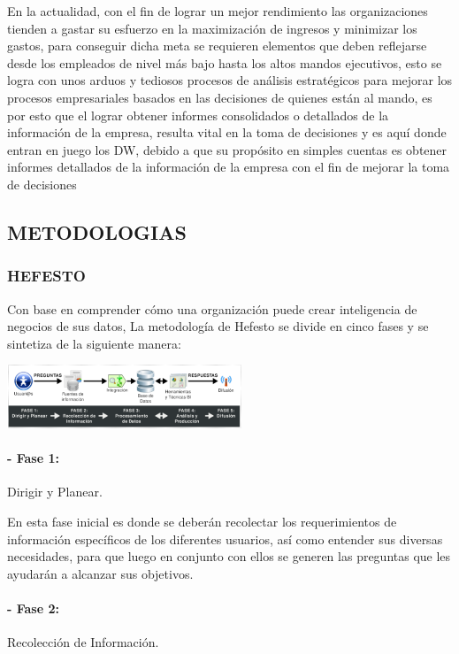 \documentclass[twoside,twocolumn]{article}
\begin{document}
En la actualidad, con el fin de lograr un mejor rendimiento las organizaciones tienden a gastar su esfuerzo en la maximización de ingresos y minimizar los gastos, para conseguir dicha meta se requieren elementos que deben reflejarse desde los empleados de nivel más bajo hasta los altos mandos ejecutivos, esto se logra con unos arduos y tediosos procesos de análisis estratégicos para mejorar los procesos empresariales basados en las decisiones de quienes están al mando, es por esto que el lograr obtener informes consolidados o detallados de la información de la empresa, resulta vital en la toma de decisiones y es aquí donde entran en juego los DW, debido a que su propósito en simples cuentas es obtener informes detallados de la información de la empresa con el fin de mejorar la toma de decisiones 

\subsection{METODOLOGIAS}
\subsubsection{HEFESTO}
Con base en comprender cómo una organización puede crear inteligencia de negocios de sus datos, La metodología de Hefesto se divide en cinco fases y se sintetiza de la siguiente manera: 


\includegraphics[width=7cm]{imagenes/img1.PNG}

\paragraph{- Fase 1: }

Dirigir y Planear.

En esta fase inicial es donde se deberán recolectar los requerimientos de información específicos de los diferentes 
usuarios, así como entender sus diversas necesidades, para que luego 
en conjunto con ellos se generen las preguntas que les ayudarán a 
alcanzar sus objetivos. 

\paragraph{- Fase 2:}
Recolección de Información.
\end{document}
